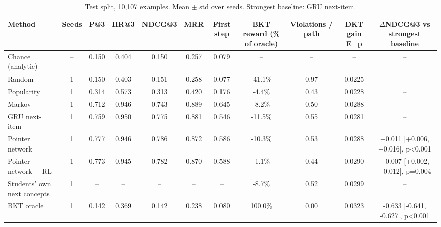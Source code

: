 \begin{table}[t]
\centering\small
\caption{Test split, 10,107 examples. Mean $\pm$ std over seeds. Strongest baseline: GRU next-item.}
\begin{tabular}{lcccccccccc}
\toprule
Method & Seeds & P@3 & HR@3 & NDCG@3 & MRR & First step & BKT reward (\% of oracle) & Violations / path & DKT gain E\_p & $\Delta$NDCG@3 vs strongest baseline \\
\midrule
Chance (analytic) & -- & 0.150 & 0.404 & 0.150 & 0.257 & 0.079 & -- & -- & -- & -- \\
Random & 1 & 0.150 & 0.403 & 0.151 & 0.258 & 0.077 & -41.1\% & 0.97 & 0.0225 & -- \\
Popularity & 1 & 0.314 & 0.573 & 0.313 & 0.420 & 0.176 & -4.4\% & 0.43 & 0.0228 & -- \\
Markov & 1 & 0.712 & 0.946 & 0.743 & 0.889 & 0.645 & -8.2\% & 0.50 & 0.0288 & -- \\
GRU next-item & 1 & 0.759 & 0.950 & 0.775 & 0.881 & 0.546 & -11.5\% & 0.55 & 0.0281 & -- \\
Pointer network & 1 & 0.777 & 0.946 & 0.786 & 0.872 & 0.586 & -10.3\% & 0.53 & 0.0288 & +0.011 [+0.006, +0.016], p<0.001 \\
Pointer network + RL & 1 & 0.773 & 0.945 & 0.782 & 0.870 & 0.588 & -1.1\% & 0.44 & 0.0290 & +0.007 [+0.002, +0.012], p=0.004 \\
Students' own next concepts & 1 & -- & -- & -- & -- & -- & -8.7\% & 0.52 & 0.0299 & -- \\
BKT oracle & 1 & 0.142 & 0.369 & 0.142 & 0.238 & 0.080 & 100.0\% & 0.00 & 0.0323 & -0.633 [-0.641, -0.627], p<0.001 \\
\bottomrule
\end{tabular}
\end{table}
